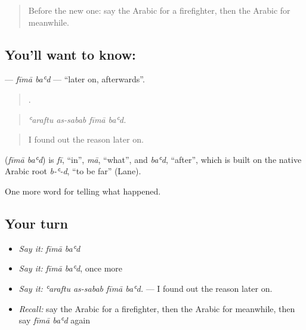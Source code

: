 \begin{quote}
Before the new one: say the Arabic for a firefighter, then the Arabic for meanwhile.
\end{quote}

\subsection*{You'll want to know:  }
\textbf{ } — \emph{fīmā baʿd} — \textquotedblleft{}later on, afterwards\textquotedblright{}.

\begin{quote}
   .
\end{quote}

\begin{quote}
\emph{ʿaraftu as-sabab fīmā baʿd.}
\end{quote}

\begin{quote}
I found out the reason later on.
\end{quote}

\begin{cousinweb}
\textbf{ } (\emph{fīmā baʿd}) is \emph{fī}, \textquotedblleft{}in\textquotedblright{}, \emph{mā}, \textquotedblleft{}what\textquotedblright{}, and \emph{baʿd}, \textquotedblleft{}after\textquotedblright{}, which is built on the native Arabic root \emph{b-ʿ-d}, \textquotedblleft{}to be far\textquotedblright{} (Lane).
\end{cousinweb}

\begin{grammarlens}[title={What you've built}]
One more word for telling what happened.
\end{grammarlens}

\subsection*{Your turn}
\begin{itemize}
\raggedright
  \item \emph{Say it:} \emph{fīmā baʿd}
  \item \emph{Say it:} \emph{fīmā baʿd}, once more
  \item \emph{Say it:} \emph{ʿaraftu as-sabab fīmā baʿd.} — I found out the reason later on.
  \item \emph{Recall:} say the Arabic for a firefighter, then the Arabic for meanwhile, then say \emph{fīmā baʿd} again
\end{itemize}

